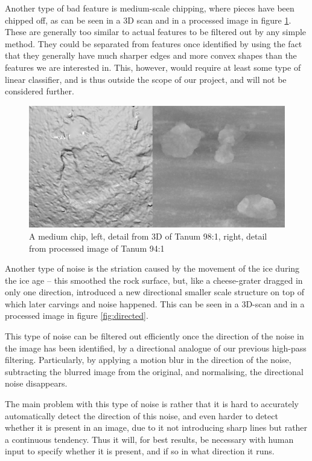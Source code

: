 \documentclass[a4paper,reqno,oneside]{amsart} %
\theoremstyle{definition}
\theoremstyle{remark}
\numberwithin{equation}{section}
\begin{document}
Another type of bad feature is medium-scale chipping, where pieces have been chipped off, as can be seen in a 3D scan and in a processed image in figure \ref{fig:mediumchip}. These are generally too similar to actual features to be filtered out by any simple method. They could be separated from features once identified by using the fact that they generally have much sharper edges and more convex shapes than the features we are interested in. This, however, would require at least some type of linear classifier, and is thus outside the scope of our project, and will not be considered further.

\begin{figure}[!htb]
\centering
\includegraphics[scale=.5]{mediumchips.png}
\caption{A medium chip, left, detail from 3D of Tanum 98:1, right, detail from processed image of Tanum 94:1}
\label{fig:mediumchip}
\end{figure}


Another type of noise is the striation caused by the movement of the ice during the ice age -- this smoothed the rock surface, but, like a cheese-grater dragged in only one direction, introduced a new directional smaller scale structure on top of which later carvings and noise happened. This can be seen in a 3D-scan and in a processed image in figure \ref{fig:directed}.

This type of noise can be filtered out efficiently once the direction of the noise in the image has been identified, by a directional analogue of our previous high-pass filtering. Particularly, by applying a motion blur in the direction of the noise, subtracting the blurred image from the original, and normalising, the directional noise disappears. 

The main problem with this type of noise is rather that it is hard to accurately automatically detect the direction of this noise, and even harder to detect whether it is present in an image, due to it not introducing sharp lines but rather a continuous tendency. Thus it will, for best results, be necessary with human input to specify whether it is present, and if so in what direction it runs.
\end{document}
